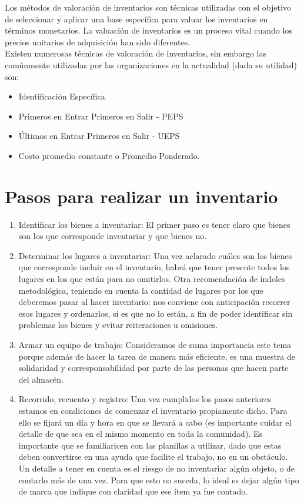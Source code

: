 Los métodos de valoración de inventarios son técnicas utilizadas con el objetivo de seleccionar y aplicar una base específica para valuar los inventarios en términos monetarios. La valuación de inventarios es un proceso vital cuando los precios unitarios de adquisición han sido diferentes.\\

Existen numerosas técnicas de valoración de inventarios, sin embargo las comúnmente utilizadas por las organizaciones en la actualidad (dada su utilidad) son:

\begin{itemize}
\item Identificación Específica 
\item Primeros en Entrar Primeros en Salir - PEPS
\item Últimos en Entrar Primeros en Salir - UEPS
\item Costo promedio constante o Promedio Ponderado.
\end{itemize}

\section{Pasos para realizar un inventario}

\begin{enumerate}
\item Identificar los bienes a inventariar: El primer paso es tener claro que bienes son los que corresponde inventariar y que bienes no.
\item Determinar los lugares a inventariar: Una vez aclarado cuáles son los bienes que corresponde incluir en el inventario, habrá que tener presente todos los lugares en los que están para no omitirlos. Otra recomendación de índoles metodológica, teniendo en cuenta la cantidad de lugares por los que deberemos pasar al hacer inventario: nos conviene con anticipación recorrer esos lugares y ordenarlos, si es que no lo están, a fin de poder identificar sin problemas los bienes y evitar reiteraciones u omisiones.
\item Armar un equipo de trabajo: Consideramos de suma importancia este tema porque además de hacer la tarea de manera más eficiente, es una muestra de solidaridad y corresponsabilidad por parte de las personas que hacen parte del almacén.
\item Recorrido, recuento y registro: Una vez cumplidos los pasos anteriores estamos en condiciones de comenzar el inventario propiamente dicho. Para ello se fijará un día y hora en que se llevará a cabo (es importante cuidar el detalle de que sea en el mismo momento en toda la comunidad). Es importante que se familiaricen con las planillas a utilizar, dado que estas deben convertirse en una ayuda que facilite el trabajo, no en un obstáculo. Un detalle a tener en cuenta es el riesgo de no inventariar algún objeto, o de contarlo más de una vez. Para que esto no suceda, lo ideal es dejar algún tipo de marca que indique con claridad que ese ítem ya fue contado.
\end{enumerate}

